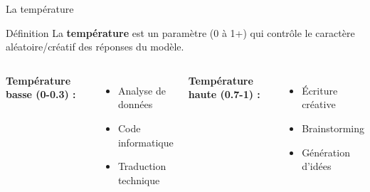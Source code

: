 \begin{frame}{La température}
\begin{block}{Définition}
La \textbf{température} est un paramètre (0 à 1+) qui contrôle le caractère aléatoire/créatif des réponses du modèle.
\end{block}

\vspace{0.3cm}

\begin{center}
\end{center}

\vspace{0.3cm}

\begin{columns}
\textbf{Température basse (0-0.3) :}
\begin{itemize}
    \item Analyse de données
    \item Code informatique
    \item Traduction technique
\end{itemize}

\textbf{Température haute (0.7-1) :}
\begin{itemize}
    \item Écriture créative
    \item Brainstorming
    \item Génération d'idées
\end{itemize}
\end{columns}
\end{frame}

